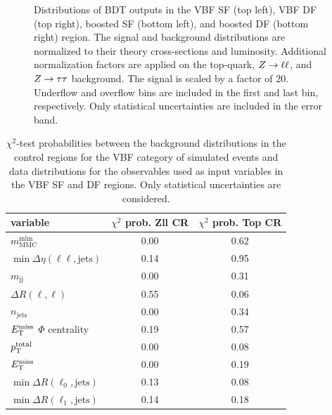 \begin{figure}[htb]
\begin{subfigure}[t]{0.45\textwidth}
    \end{subfigure}
    \caption{Distributions of BDT outputs in the VBF SF (top left), VBF DF (top right), boosted SF (bottom left), and boosted DF (bottom right) region.
             The signal and background distributions are normalized to their theory cross-sections and luminosity.
             Additional normalization factors are applied on the top-quark, $Z \to \ell \ell$, and $Z \to \tau \tau$ background.
             The signal is scaled by a factor of 20.
             Underflow and overflow bins are included in the first and last bin, respectively.
             Only statistical uncertainties are included in the error band.}\label{fig:mva:modeling:sr:bdts}
\end{figure}

\begin{table}
	\centering
    \caption{$\chi^2$-test probabilities between the background distributions in the control regions for the VBF category of simulated events and data distributions for the observables
    used as input variables in the VBF SF and DF regions.
    Only statistical uncertainties are considered.}\label{tab:mva:modeling:cr:vbf}
	\begin{tabular}{lcc}
		\toprule
		variable & $\chi^2$ prob. Zll CR & $\chi^2$ prob. Top CR \\ \midrule
		$m_\text{MMC}^\text{mlm}$                   & 0.00 & 0.62 \\
		$\min \Delta \eta (\ell\ell, \text{jets})$  & 0.14 & 0.95 \\
		$m_\text{jj}$                               & 0.00 & 0.31 \\
		$\Delta R(\ell,\ell)$                       & 0.55 & 0.06 \\
		$n_\text{jets}$                             & 0.00 & 0.34 \\
		$E_\text{T}^\text{miss}$ $\Phi$ centrality                 & 0.19 & 0.57 \\
		$p_\text{T}^\text{total}$                          & 0.00 & 0.08 \\
		$E_\text{T}^\text{miss}$                                   & 0.00 & 0.19 \\
		$\min \Delta R (\ell_0, \text{jets})$       & 0.13 & 0.08 \\
		$\min \Delta R (\ell_1, \text{jets})$       & 0.14 & 0.18 \\
		\bottomrule
	\end{tabular}
\end{table}

